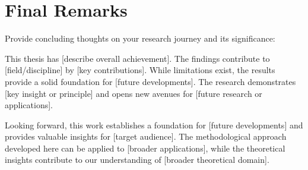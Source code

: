 \section{Final Remarks}

Provide concluding thoughts on your research journey and its significance:

This thesis has [describe overall achievement]. The findings contribute to [field/discipline] by [key contributions]. While limitations exist, the results provide a solid foundation for [future developments]. The research demonstrates [key insight or principle] and opens new avenues for [future research or applications].

Looking forward, this work establishes a foundation for [future developments] and provides valuable insights for [target audience]. The methodological approach developed here can be applied to [broader applications], while the theoretical insights contribute to our understanding of [broader theoretical domain].
